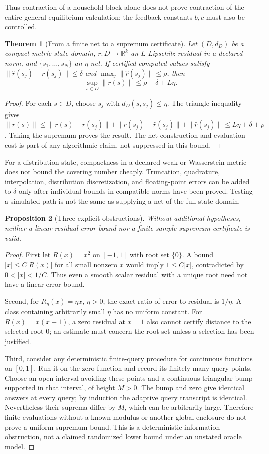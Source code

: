 \documentclass[11pt,a4paper]{article}
\newcommand{\R}{\mathbb R}
\newtheorem{theorem}{Theorem}
\newtheorem{proposition}[theorem]{Proposition}
\theoremstyle{definition}
\begin{document}
Thus contraction of a household block alone does not prove contraction of the entire general-equilibrium calculation: the feedback constants $b,c$ must also be controlled.

\begin{theorem}[From a finite net to a supremum certificate]
Let $(D,d_D)$ be a compact metric state domain, $r:D\to\R^k$ an $L$-Lipschitz residual in a declared norm, and $\{s_1,\ldots,s_N\}$ an $\eta$-net. If certified computed values satisfy
$\|\widehat r(s_j)-r(s_j)\|\le\delta$ and
$\max_j\|\widehat r(s_j)\|\le\rho$, then
\[
 \sup_{s\in D}\|r(s)\|\le\rho+\delta+L\eta.
\]
\end{theorem}
\begin{proof}
For each $s\in D$, choose $s_j$ with $d_D(s,s_j)\le\eta$. The triangle inequality gives
$\|r(s)\|\le\|r(s)-r(s_j)\|+\|r(s_j)-\widehat r(s_j)\|+\|\widehat r(s_j)\|\le L\eta+\delta+\rho$.
Taking the supremum proves the result. The net construction and evaluation cost is part of any algorithmic claim, not suppressed in this bound.
\end{proof}

For a distribution state, compactness in a declared weak or Wasserstein metric does not bound the covering number cheaply. Truncation, quadrature, interpolation, distribution discretization, and floating-point errors can be added to $\delta$ only after individual bounds in compatible norms have been proved. Testing a simulated path is not the same as supplying a net of the full state domain.

\begin{proposition}[Three explicit obstructions]
Without additional hypotheses, neither a linear residual error bound nor a finite-sample supremum certificate is valid.
\end{proposition}
\begin{proof}
First let $R(x)=x^2$ on $[-1,1]$ with root set $\{0\}$. A bound $|x|\le C|R(x)|$ for all small nonzero $x$ would imply $1\le C|x|$, contradicted by $0<|x|<1/C$. Thus even a smooth scalar residual with a unique root need not have a linear error bound.

Second, for $R_\eta(x)=\eta x$, $\eta>0$, the exact ratio of error to residual is $1/\eta$. A class containing arbitrarily small $\eta$ has no uniform constant. For $R(x)=x(x-1)$, a zero residual at $x=1$ also cannot certify distance to the selected root $0$; an estimate must concern the root set unless a selection has been justified.

Third, consider any deterministic finite-query procedure for continuous functions on $[0,1]$. Run it on the zero function and record its finitely many query points. Choose an open interval avoiding these points and a continuous triangular bump supported in that interval, of height $M>0$. The bump and zero give identical answers at every query; by induction the adaptive query transcript is identical. Nevertheless their suprema differ by $M$, which can be arbitrarily large. Therefore finite evaluations without a known modulus or another global enclosure do not prove a uniform supremum bound. This is a deterministic information obstruction, not a claimed randomized lower bound under an unstated oracle model.
\end{proof}
\end{document}
